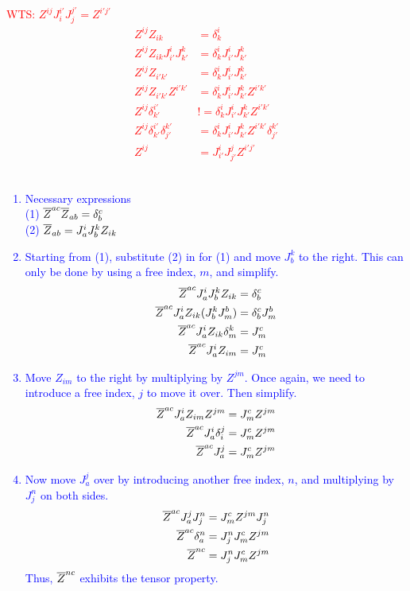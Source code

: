 \documentclass[12pt,a4paper]{report}
\newcommand{\RED}[1]{\textcolor{red}{#1}}
\newcommand{\BLUE}[1]{\textcolor{blue}{#1}}
\begin{document}
\RED{WTS: $Z^{ij}J^{i'}_iJ^{j'}_j=Z^{i'j'}$
\begin{align*}
	Z^{ij}Z_{ik}&=\delta^i_k\\
	Z^{ij}Z_{ik}J^i_{i'}J^k_{k'} &= \delta^i_kJ^i_{i'}J^k_{k'}\\
	Z^{ij}Z_{i'k'} &= \delta^i_kJ^i_{i'}J^k_{k'}\\
	Z^{ij}Z_{i'k'}Z^{i'k'} &= \delta^i_kJ^i_{i'}J^k_{k'}Z^{i'k'} \\
	Z^{ij}\delta^{i'}_{k'} &!= \delta^i_kJ^i_{i'}J^k_{k'}Z^{i'k'} \\
	Z^{ij}\delta^{i'}_{k'} \delta^{k'}_{j'}&= \delta^i_kJ^i_{i'}J^k_{k'}Z^{i'k'}\delta^{k'}_{j'}  \\
	Z^{ij}&= J^i_{i'}J^j_{j'}Z^{i'j'}
\end{align*}
}\\

\BLUE{\begin{enumerate}
	\item Necessary expressions\\
	(1) $\overline{Z}^{ac}\overline{Z}_{ab} = \delta_b^c$ \\
	(2) $\overline{Z}_{ab}= J_a^iJ_b^kZ_{ik}$
	\item Starting from (1), substitute (2) in for (1) and move $J_b^k$ to the right.  This can only be done by using a free index, $m$, and simplify.
	\begin{align*}
		\overline{Z}^{ac}J_a^iJ_b^kZ_{ik} &= \delta_b^c \\
		\overline{Z}^{ac}J_a^iZ_{ik}(J_b^kJ_m^b) &= \delta_b^cJ_m^b \\
		\overline{Z}^{ac}J_a^iZ_{ik}\delta_m^k &= J_m^c\\
		\overline{Z}^{ac}J_a^iZ_{im} &= J_m^c
	\end{align*}
	\item Move $Z_{im}$ to the right by multiplying by $Z^{jm}$.  Once again, we need to introduce a free index, $j$ to move it over.  Then simplify.
	\begin{align*}
		\overline{Z}^{ac}J_a^iZ_{im}Z^{jm} &= J_m^cZ^{jm} \\
		\overline{Z}^{ac}J_a^i\delta_i^j &= J_m^cZ^{jm} \\
		\overline{Z}^{ac}J_a^j &= J_m^cZ^{jm}
	\end{align*}
	\item Now move $J_a^j$ over by introducing another free index, $n$, and multiplying by $J_j^n$ on both sides.
	\begin{align*}
		\overline{Z}^{ac}J_a^jJ_j^n &= J_m^cZ^{jm}J_j^n \\
		\overline{Z}^{ac}\delta_a^n &= J_j^nJ_m^cZ^{jm} \\
		\overline{Z}^{nc} &= J_j^nJ_m^cZ^{jm} 
	\end{align*}Thus, $\overline{Z}^{nc}$ exhibits the tensor property.
\end{enumerate}
}
\end{document}
